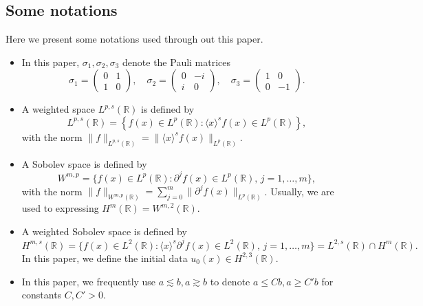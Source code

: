 \documentclass[11pt]{article}
\numberwithin{equation}{section}
\begin{document}
\subsection{Some notations}
Here we present some notations used through out this paper.
\begin{itemize}
    \item In this paper, $\sigma_1,\sigma_2,\sigma_3$ denote the Pauli matrices
    \begin{equation*}
       \sigma_1= \left(\begin{array}{cc}
            0 & 1 \\
            1 & 0
        \end{array}\right),\quad \sigma_2= \left(\begin{array}{cc}
            0 & -i \\
            i & 0
        \end{array}\right),\quad \sigma_3= \left(\begin{array}{cc}
            1 & 0 \\
            0 & -1
        \end{array}\right).
    \end{equation*}

    \item A weighted space $L^{p,s}(\mathbb{R})$ is defined by
    \begin{equation*}
        L^{p,s}(\mathbb{R})=\left\{f(x)\in L^{p}(\mathbb{R}):\langle x \rangle ^sf(x)\in L^{p}(\mathbb{R})\right\},
    \end{equation*}
    with the norm $\|f\|_{ L^{p,s}(\mathbb{R})}=\|\langle x \rangle ^sf(x)\|_{ L^{p}(\mathbb{R})}$.
    \item A Sobolev space is defined by
    \begin{equation*}
        W^{m,p}=\{f(x)\in L^{p}(\mathbb{R}):\partial^jf(x)\in L^{p}(\mathbb{R}),\,j=1,\dots,m\},
    \end{equation*}
     with the norm $\|f\|_{ W^{m,p}(\mathbb{R})}=\displaystyle\sum_{j=0}^m\|\partial^j f(x)\|_{L^{p}(\mathbb{R})}$. Usually, we are used to expressing $H^m(\mathbb{R})=W^{m,2}(\mathbb{R})$.
    \item A weighted Sobolev space is defined by
    \begin{equation*}
        H^{m,s}(\mathbb{R})=\{f(x)\in L^{2}(\mathbb{R}):\langle x \rangle ^s\partial^j f(x)\in L^{2}(\mathbb{R}),\,j=1,\dots,m\}= L^{2,s}(\mathbb{R})\cap H^m(\mathbb{R}).
    \end{equation*}
    In this paper, we define the initial data $u_0(x)\in H^{2,3}(\mathbb{R})$.
    \item In this paper, we frequently use $a\lesssim b,a \gtrsim b$ to denote $a\leqslant Cb,a\geqslant C'b$ for constants $C,C'>0$.
\end{itemize}
\end{document}
